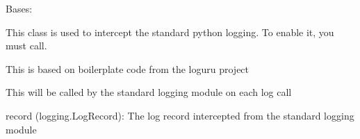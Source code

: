 \documentclass[letterpaper,10pt,english]{sphinxmanual}
\begin{document}
\begin{fulllineitems}
\label{\detokenize{aliro_actuator.log:aliro_actuator.log.InterceptHandler}}
\pysigstartsignatures
{}
\pysigstopsignatures
\sphinxAtStartPar
Bases: 

\sphinxAtStartPar
This class is used to intercept the standard python logging.
To enable it, you must call.

\sphinxAtStartPar
This is based on boilerplate code from the loguru project

\sphinxAtStartPar
{}

\begin{fulllineitems}
\label{\detokenize{aliro_actuator.log:aliro_actuator.log.InterceptHandler.emit}}
\pysigstartsignatures
{}
\pysigstopsignatures
\sphinxAtStartPar
This will be called by the standard logging module on each log call
\begin{description}
\sphinxAtStartPar
record (logging.LogRecord): The log record intercepted from the standard
logging module

\end{description}

\end{fulllineitems}


\begin{fulllineitems}
\label{\detokenize{aliro_actuator.log:aliro_actuator.log.InterceptHandler.loglevel_mapping}}
\pysigstartsignatures
{}
\pysigstopsignatures
\end{fulllineitems}


\end{fulllineitems}
\end{document}

